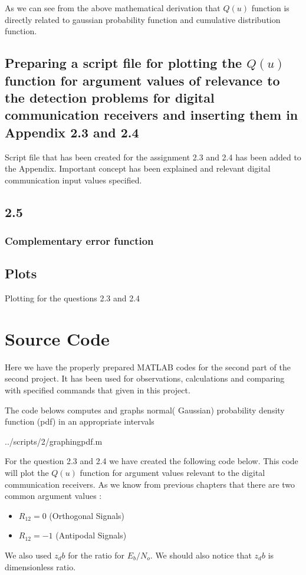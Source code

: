 As we can see from the above mathematical derivation that $Q(u)$ function is directly related to gaussian probability function and cumulative distribution function.
\subsection{Preparing a script file for plotting the $Q(u)$ function for argument values of relevance to the detection problems for digital communication receivers and inserting them in Appendix 2.3 and 2.4 }
Script file that has been created for the assignment 2.3 and 2.4 has been added to the Appendix. Important concept has been explained and relevant digital communication input values specified.
\subsection{2.5}





\subsubsection{Complementary error function}



\subsection{Plots}
Plotting for the questions 2.3 and 2.4
\section{Source Code}
Here we have the properly prepared MATLAB codes for the second part of the second project. It has been used for observations, calculations and comparing with specified commands that given in this project.

The code belows computes and graphs normal( Gaussian) probability density function (pdf) in an appropriate intervals

\begin{lstinputlisting}[language=Octave]{../scripts/2/graphingpdf.m}
\end{lstinputlisting}


For the question 2.3 and 2.4 we have created the following code below. This code will plot the $Q(u)$ function for argument values relevant to the digital communication receivers. As we know from previous chapters that there are two common argument values :
\begin{itemize}
	\item $R_12=0 $ (Orthogonal Signals) 
	\item $R_12=-1$ (Antipodal Signals)
\end{itemize}
We also used $z_db$ for the ratio for $E_b/N_o$. We should also notice that $z_db$ is dimensionless ratio.

